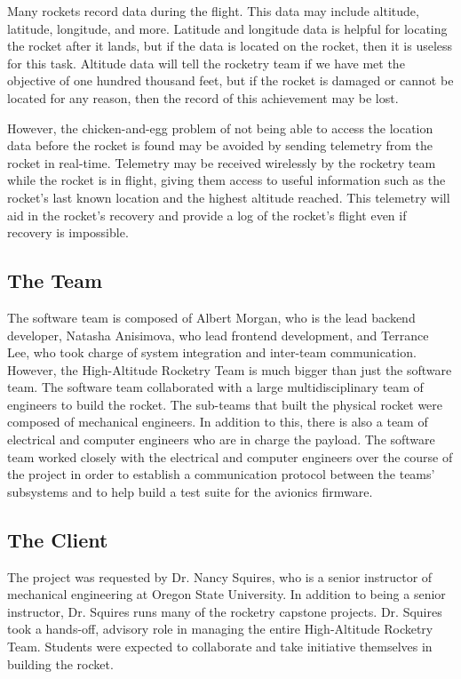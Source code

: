\documentclass[10pt,draftclsnofoot,onecolumn]{IEEEtran}
\begin{document}
	Many rockets record data during the flight. This data may include
	altitude, latitude, longitude, and more.
	Latitude and longitude
	data is helpful for locating the rocket after it lands, but
	if the data is located on the rocket, then it is useless
	for this task.
	Altitude data will tell the rocketry team if we have
	met the objective of one hundred thousand feet, but if the rocket
	is damaged or cannot be located for any reason, then the record
	of this achievement may be lost.

	However, the chicken-and-egg problem of not being able to access
	the location data before the rocket is found may be avoided by sending
	telemetry from the rocket in real-time.
	Telemetry may be received wirelessly
	by the rocketry team while the rocket is in flight, giving them
	access to useful information such as the rocket's last known location
	and the highest altitude reached. This telemetry will aid in the
	rocket's recovery and provide a log of the rocket's flight even if
	recovery is impossible.


	\subsection{The Team}
	The software team is composed of Albert Morgan, who is the lead backend developer,
	Natasha Anisimova, who lead frontend development,
	and Terrance Lee, who took charge of system integration and inter-team communication.
	However, the High-Altitude Rocketry Team is much bigger than just the software team.
	The software team collaborated with a large multidisciplinary team of engineers to build the rocket.
	The sub-teams that built the physical rocket were composed of mechanical engineers.
	In addition to this, there is also a team of electrical and computer engineers who are
	in charge the payload.
	The software team worked closely with the electrical and computer engineers over the course
	of the project in order to establish a communication protocol between the teams' subsystems
	and to help build a test suite for the avionics firmware.
	

	\subsection{The Client}
	The project was requested by Dr. Nancy Squires, who is a senior
	instructor of mechanical engineering at Oregon State University.
	In addition to being a senior instructor, Dr. Squires runs many
	of the rocketry capstone projects.
	Dr. Squires took a hands-off, advisory role in managing the entire High-Altitude Rocketry Team.
	Students were expected to collaborate and take initiative themselves in building the rocket.
	
\end{document}
